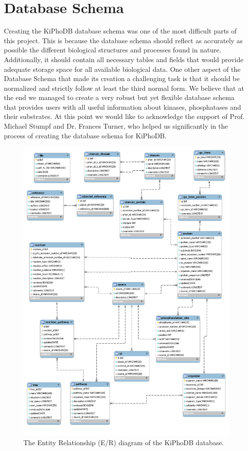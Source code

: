 \section{Database Schema}

Creating the KiPhoDB database schema was one of the most difficult parts of this project.
This is because the database schema should reflect as accurately as possible the different biological structures and processes found in nature.
Additionally, it should contain all necessary tables and fields that would provide adequate storage space for all available biological data.
One other aspect of the Database Schema that made its creation a challenging task is that it should be normalized and strictly follow at least the third normal form.
We believe that at the end we managed to create a very robust but yet flexible database schema that provides users with all useful information about kinases, phosphatases and their substrates.
At this point we would like to acknowledge the support of Prof. Michael Stumpf and Dr. Frances Turner, who helped us significantly in the process of creating the database schema for KiPhoDB.

\begin{figure}[htp]
\centering
\includegraphics[scale=0.43]{pictures/DatabaseSchema.png}
\caption{The Entity Relationship (E/R) diagram of the KiPhoDB database.}
\label{DatabaseSchema}
\end{figure}

